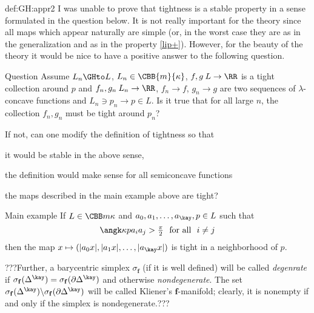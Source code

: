 {\begin{subthm}{def:GH:appr2}
I was unable to prove that tightness is a stable property in a sense
formulated in the question below.
It is not really important for the theory since all maps which appear naturally 
are simple (or, in the worst case they are as in the generalization and
as in the property \ref{lip+}).
However, for the beauty of the theory it would be nice to have a positive answer to
the following question.

\begin{thm}{Question} Assume $L_n\GHto L$, $L_n\in\CBB{m}{\kappa}$,
$f,g\:L\to \RR$ is a tight collection around $p$ and $f_n,g_n\:L_n\to\RR$, $f_n\to
f$, $g_n\to g$ are two sequences of $\lambda$-concave
functions and $L_n\ni p_n\to p\in L$. 
Is it true that for all large $n$, the collection $f_n,g_n$ must be
tight around $p_n$?

If not, can one modify the definition of tightness so that
\begin{subthm}{}
it would be stable in the above sense,
\end{subthm}

\begin{subthm}{} the definition would make sense for all semiconcave functions
\end{subthm}

\begin{subthm}{} the maps described in the main example above are tight?\end{subthm}
\end{thm}










\begin{thm}{Main example} If $L\in\CBB m\kappa$ and
$a_0,a_1,\dots,a_\kay,p\in L$ such that 
$$\angk\kappa p{a_i}{a_j}>\tfrac\pi2\ \ \text{for all}\ \  i\not=j$$ 
then the map
$x\mapsto (|a_0x|,|a_1x|,\dots,|a_\kay x|)$ is tight in a neighborhood of
$p$.
\end{thm}














???Further, a barycentric simplex $\sigma_\mathbf{f}$ (if it is well defined) will be called \emph{degenrate} if $\sigma_\mathbf{f}(\Delta^\kay)=\sigma_\mathbf{f}(\partial\Delta^\kay)$ and otherwise \emph{nondegenerate}.
The set $\sigma_\mathbf{f}(\Delta^\kay)\backslash\sigma_\mathbf{f}(\partial\Delta^\kay)$ will be called Kliener's $\mathbf{f}$-manifold; clearly, it is nonempty if and only if the simplex is nondegenerate.???
















\end{subthm}}
